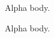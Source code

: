 \documentclass{beamer}
\begin{document}
\begin{frame}{}
Alpha body.
\end{frame}
\begin{frame}
Alpha body.
\end{frame}
\end{document}
